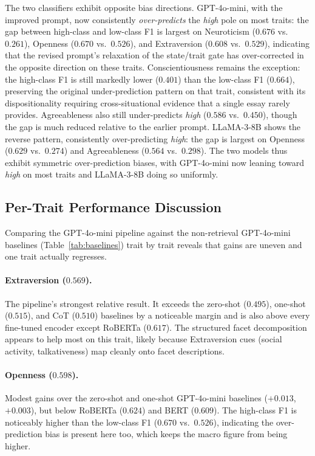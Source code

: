 \documentclass[../main.tex]{subfiles}
\begin{document}
The two classifiers exhibit opposite bias directions.
GPT-4o-mini, with the improved prompt, now consistently \textit{over-predicts}
the \textit{high} pole on most traits: the gap between high-class and low-class
F1 is largest on Neuroticism ($0.676$ vs.\ $0.261$), Openness ($0.670$ vs.\
$0.526$), and Extraversion ($0.608$ vs.\ $0.529$), indicating that the revised
prompt's relaxation of the state/trait gate has over-corrected in the opposite
direction on these traits. Conscientiousness remains the exception: the high-class
F1 is still markedly lower ($0.401$) than the low-class F1 ($0.664$), preserving
the original under-prediction pattern on that trait, consistent with its
dispositionality requiring cross-situational evidence that a single essay rarely
provides. Agreeableness also still under-predicts \textit{high} ($0.586$ vs.\
$0.450$), though the gap is much reduced relative to the earlier prompt.
LLaMA-3-8B shows the reverse pattern, consistently over-predicting
\textit{high}: the gap is largest on Openness ($0.629$ vs.\ $0.274$) and
Agreeableness ($0.564$ vs.\ $0.298$). The two models thus exhibit symmetric
over-prediction biases, with GPT-4o-mini now leaning toward \textit{high} on
most traits and LLaMA-3-8B doing so uniformly.

\subsection{Per-Trait Performance Discussion}

Comparing the GPT-4o-mini pipeline against the non-retrieval GPT-4o-mini
baselines (Table~\ref{tab:baselines}) trait by trait reveals that gains are
uneven and one trait actually regresses.

\paragraph{Extraversion ($0.569$).}
The pipeline's strongest relative result. It exceeds the zero-shot ($0.495$),
one-shot ($0.515$), and CoT ($0.510$) baselines by a noticeable margin and is
also above every fine-tuned encoder except RoBERTa ($0.617$). The structured
facet decomposition appears to help most on this trait, likely because
Extraversion cues (social activity, talkativeness) map cleanly onto facet
descriptions.

\paragraph{Openness ($0.598$).}
Modest gains over the zero-shot and one-shot GPT-4o-mini baselines
($+0.013$, $+0.003$), but below RoBERTa ($0.624$) and BERT ($0.609$). The
high-class F1 is noticeably higher than the low-class F1 ($0.670$ vs.\ $0.526$),
indicating the over-prediction bias is present here too, which keeps the macro
figure from being higher.
\end{document}
